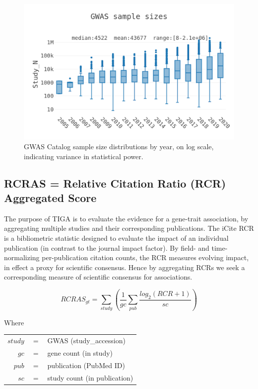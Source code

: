 \begin{figure}
	\includegraphics[width=\textwidth]{figures/tiga/FIG02_Sample_sizes.png}
	\caption{GWAS Catalog sample size distributions by year, on log scale, indicating variance in statistical power.}
	\label{fig:TIGA_Samp_sizes}
\end{figure}

\subsection{RCRAS = Relative Citation Ratio (RCR) Aggregated Score}

The purpose of TIGA is to evaluate the evidence for a gene-trait association, by aggregating multiple studies and their corresponding publications.  The iCite RCR\cite{Hutchins2016-hs} is a bibliometric statistic designed to evaluate the impact of an individual publication (in contrast to the journal impact factor).  By field- and time-normalizing per-publication citation counts, the RCR measures evolving impact, in effect a proxy for scientific consensus.  Hence by aggregating RCRs we seek a corresponding measure of scientific consensus for associations.

\begin{equation} RCRAS_{gt} = \sum_{study} \left(\frac{1}{gc} \sum_{pub} \frac{log_{2}(RCR + 1)}{sc}\right)
\end{equation}

Where\\
\begin{center}
\begin{tabular}{ r c l }
    $study$ & $=$ & GWAS (study\_accession)\\
	$gc$ & $=$ & gene count (in study)	\\
	$pub$ & $=$ & publication (PubMed ID)	\\
	$sc$ & $=$ & study count (in publication)	\\
\end{tabular}
\end{center}

